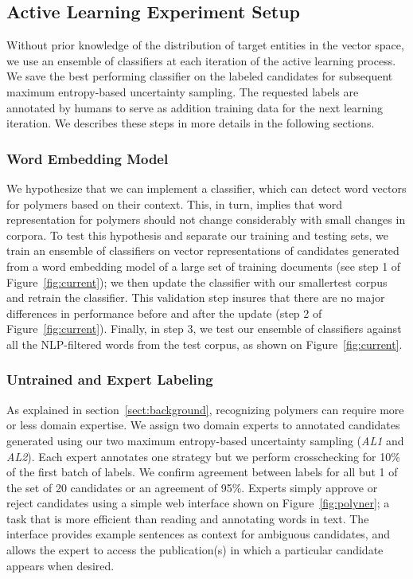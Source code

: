 \subsection{Active Learning Experiment Setup}
Without prior knowledge of the distribution of target entities in the vector space, we use an ensemble of classifiers at each iteration of the active learning process. 
We save the best performing classifier on the labeled candidates for subsequent maximum entropy-based uncertainty sampling. 
The requested labels are annotated by humans to serve as addition training data for the next learning iteration. 
We describes these steps in more details in the following sections.\\

\subsubsection{Word Embedding Model}
We hypothesize that we can implement a classifier, which can detect word vectors for polymers based on their context. 
This, in turn, implies that word representation for polymers should not change considerably with small changes in corpora.
To test this hypothesis and separate our training and testing sets, we train an ensemble of classifiers on vector representations of candidates generated from a word embedding model of a large set of training documents (see step 1 of Figure~\ref{fig:current}); 
we then update the classifier with our \textemdash smaller\textemdash test corpus and retrain the classifier. 
This validation step insures that there are no major differences in performance before and after the update (step 2 of Figure~\ref{fig:current}).
Finally, in step 3, we test our ensemble of classifiers against all the NLP-filtered words from the test corpus, as shown on Figure~\ref{fig:current}.\\

\subsubsection{Untrained and Expert Labeling}
As explained in section~\ref{sect:background}, recognizing polymers can require more or less domain expertise.
We assign two domain experts to annotated candidates generated using our two maximum entropy-based uncertainty sampling (\textit{AL1} and \textit{AL2}). 
Each expert annotates one strategy but we perform crosschecking for 10\% of the first batch of labels. We confirm agreement between labels for all but 1 of the set of 20 candidates or an agreement of 95\%.
Experts simply approve or reject candidates using a simple web interface shown on Figure~\ref{fig:polyner}; a task that is more efficient than reading and annotating words in text.
The interface
provides example sentences as context for ambiguous candidates,
and allows the expert to access the publication(s) in which a particular candidate
appears when desired.


